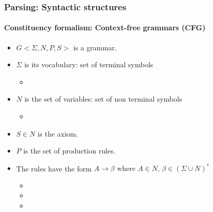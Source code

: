 \documentclass[xcolor=table]{beamer}
\begin{document}
\begin{frame}
\frametitle{Parsing: Syntactic structures}
\framesubtitle{Constituency formalism: Context-free grammars (CFG)}

\begin{minipage}{.68\textwidth}
\begin{itemize}
	\item $G <\Sigma, N, P, S>$ is a grammar.
	\item $\Sigma$ is its vocabulary: set of terminal symbols
	\begin{itemize}
		\item {}
	\end{itemize}
	\item $N$ is the set of variables: set of non terminal symbols 
	\begin{itemize}
		\item {}
	\end{itemize}
\end{itemize}
\end{minipage}
\begin{minipage}{.3\textwidth}
\end{minipage}

\begin{itemize}
	\item $S \in N$ is the axiom.
	\item $P$ is the set of production rules.
	\item The rules have the form $A \rightarrow \beta \text{ where } A \in N,\, \beta \in (\Sigma \cup N)^*$
	\begin{itemize}
		\item {}
		\item {}
		\item {}
	\end{itemize}
\end{itemize}

\end{frame}
\end{document}
